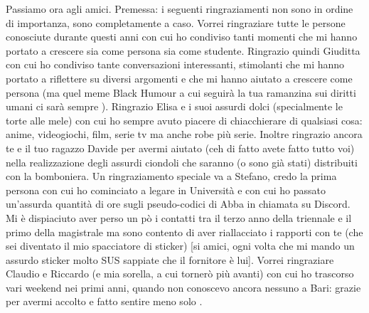 Passiamo ora agli amici. Premessa: i seguenti ringraziamenti non sono in ordine di importanza, sono completamente a caso. Vorrei ringraziare tutte le persone conosciute durante questi anni con cui ho condiviso tanti momenti che mi hanno portato a crescere sia come persona sia come studente. Ringrazio quindi Giuditta con cui ho condiviso tante conversazioni interessanti, stimolanti che mi hanno portato a riflettere su diversi argomenti e che mi hanno aiutato a crescere come persona (ma quel meme Black Humour a cui seguirà la tua ramanzina sui diritti umani ci sarà sempre ). Ringrazio Elisa e i suoi assurdi dolci (specialmente le torte alle mele) con cui ho sempre avuto piacere di chiacchierare di qualsiasi cosa: anime, videogiochi, film, serie tv ma anche robe più serie. Inoltre ringrazio ancora te e il tuo ragazzo Davide per avermi aiutato (ceh di fatto avete fatto tutto voi) nella realizzazione degli assurdi ciondoli che saranno (o sono già stati) distribuiti con la bomboniera. Un ringraziamento speciale va a Stefano, credo la prima persona con cui ho cominciato a legare in Università e con cui ho passato un'assurda quantità di ore sugli pseudo-codici di Abba in chiamata su Discord. Mi è dispiaciuto aver perso un pò i contatti tra il terzo anno della triennale e il primo della magistrale ma sono contento di aver riallacciato i rapporti con te (che sei diventato il mio spacciatore di sticker) [si amici, ogni volta che mi mando un assurdo sticker molto SUS sappiate che il fornitore è lui]. Vorrei ringraziare Claudio e Riccardo (e mia sorella, a cui tornerò più avanti) con cui ho trascorso vari weekend nei primi anni, quando non conoscevo ancora nessuno a Bari: grazie per avermi accolto e fatto sentire meno solo .
